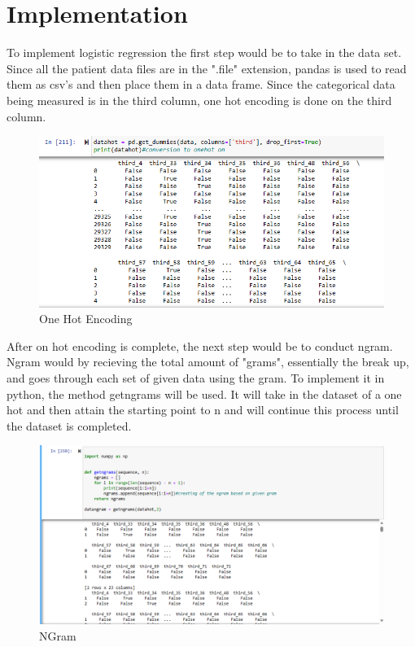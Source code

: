 \documentclass{article}
\begin{document}
\section{Implementation}
To implement logistic regression the first step would be to take in the data set. Since all the patient data files are in the ".file" extension, pandas is used to read them as csv's and then place them in a data frame. Since the categorical data being measured is in the third column, one hot encoding is done on the third column. 
\begin{figure}
    \centering
    \includegraphics[width=0.5\linewidth]{a.png}
    \caption{One Hot Encoding}
    \label{fig:enter-label}
\end{figure}
After on hot encoding is complete, the next step would be to conduct ngram. Ngram would by recieving the total amount of "grams", essentially the break up, and goes through each set of given data using the gram. To implement it in python, the method getngrams will be used. It will take in the dataset of a one hot and then attain the starting point to n and will continue this process until the dataset is completed.
\begin{figure}
    \centering
    \includegraphics[width=0.5\linewidth]{b.png}
    \caption{NGram}
    \label{fig:enter-label}
\end{figure}
\end{document}
